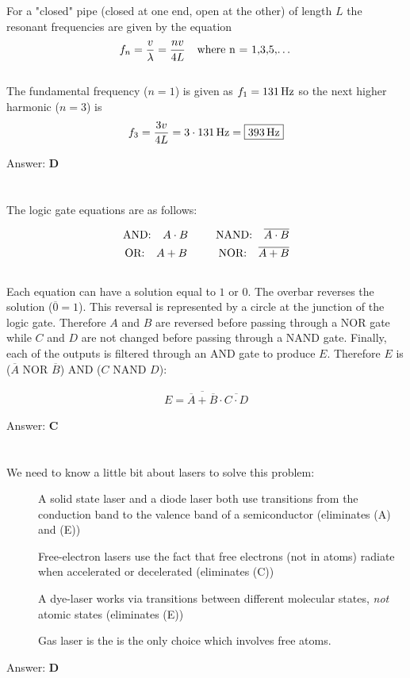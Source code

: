 \documentclass[12pt]{article}
\newcommand{\Answer}[1]{Answer: \textbf{#1}}
\newcommand{\Problem}[3]{
    \setcounter{section}{#1}
    \addtocounter{section}{-1}
    \section{}
    #3\par\par
    \Answer{#2}
}
\begin{document}
\Problem{47}{D}{%
 For a "closed" pipe (closed at one end, open at the other) of length $L$  the resonant frequencies are given by the equation
\begin{align}
f_{n} = \frac{v}{\lambda} = \frac{n v}{4L} \text{\hspace{.1 in} where n = 1,3,5,\ldots}
\end{align}
\\
The fundamental frequency ($n = 1$) is given as $f_{1} = 131\,\text{Hz}$ so the next higher harmonic ($n = 3$) is
\begin{align}
f_{3} = \frac{3 v}{4L} = 3 \cdot  131\,\text{Hz} = \boxed{393\,\text{Hz}}
\end{align}
}


\Problem{48}{C}{%
 The logic gate equations are as follows:

\begin{align}
\text{AND: \hspace{.1 in}} A \cdot B \text{\hspace{.3 in} NAND: \hspace{.1 in}} \overline{A \cdot B} \\
\text{OR: \hspace{.1 in}} A + B \text{ \hspace{.3 in} NOR: \hspace{.1 in}} \overline{A + B}
\end{align}
\\
Each equation can have a solution equal to $1$ or $0$. The overbar reverses the solution ($\overline{0} = 1$). This reversal is represented by a circle at the junction of the logic gate. Therefore $A$ and $B$ are reversed before passing through a NOR gate while $C$ and $D$ are not changed before passing through a NAND gate. Finally, each of the outputs is filtered through an AND gate to produce $E$. Therefore $E$ is ($\overline{A}$ NOR $\overline{B}$) AND ($C$ NAND $D$):

\begin{align}
E = \boxed{\overline{\overline{A} + \overline{B}} \cdot \overline{C \cdot D}}\nonumber
\end{align}
}

\Problem{49}{D}{%
We need to know a little bit about lasers to solve this problem:
\begin{description}
\item[\textbullet] A solid state laser and a diode laser both use transitions from the conduction band to the valence band of a semiconductor (eliminates (A) and (E))
\item[\textbullet] Free-electron lasers use the fact that free electrons (not in atoms) radiate when accelerated or decelerated (eliminates (C))
\item[\textbullet] A dye-laser works via transitions between different molecular states, \textit{not} atomic states (eliminates (E))
\item[\textbullet] Gas laser is the is the only choice which involves free atoms.
\end{description}
}
\end{document}
